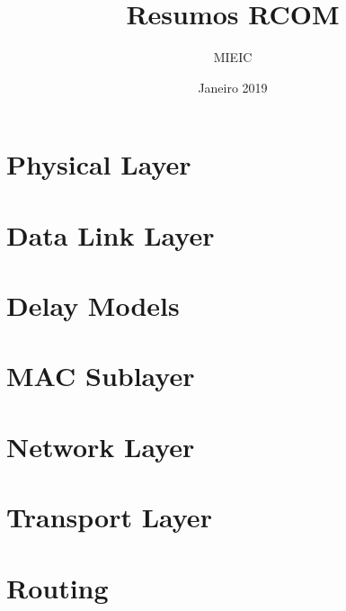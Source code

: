 \documentclass{article}
\title{Resumos RCOM}
\author{MIEIC}
\date{Janeiro 2019}
\begin{document}
 
\maketitle

\tableofcontents
 
\section{Physical Layer}


 
\section{Data Link Layer}
 


\section{Delay Models}
 


\section{MAC Sublayer}
 


\section{Network Layer}
 


\section{Transport Layer}
 


\section{Routing}
 

\end{document}

